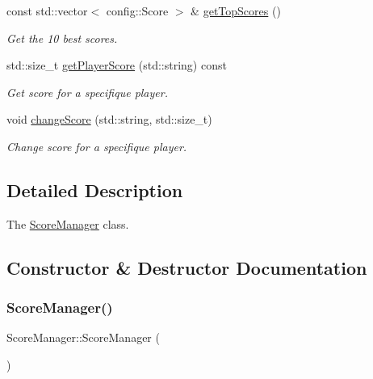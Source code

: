 \begin{DoxyCompactItemize}
\mbox{\label{classScoreManager_ad0c38dd0a27a82230d09f29ce3d12349}} 
const std\+::vector$<$ config\+::\+Score $>$ \& \hyperlink{classScoreManager_ad0c38dd0a27a82230d09f29ce3d12349}{get\+Top\+Scores} ()
\begin{DoxyCompactList}\small\item\em Get the 10 best scores. \end{DoxyCompactList}\item 
std\+::size\+\_\+t \hyperlink{classScoreManager_a9d529f071418d69a2b1745673d9d83b2}{get\+Player\+Score} (std\+::string) const
\begin{DoxyCompactList}\small\item\em Get score for a specifique player. \end{DoxyCompactList}\item 
void \hyperlink{classScoreManager_a16c1e33b2972b9609b6d568dc8b7a3b0}{change\+Score} (std\+::string, std\+::size\+\_\+t)
\begin{DoxyCompactList}\small\item\em Change score for a specifique player. \end{DoxyCompactList}\end{DoxyCompactItemize}


\subsection{Detailed Description}
The \hyperlink{classScoreManager}{Score\+Manager} class. 

\subsection{Constructor \& Destructor Documentation}
\mbox{\label{classScoreManager_a4f3866ff832127664543349da5c4fbf4}} 
\subsubsection{\texorpdfstring{Score\+Manager()}{ScoreManager()}}
{\footnotesize\ttfamily Score\+Manager\+::\+Score\+Manager (\begin{DoxyParamCaption}{ }\end{DoxyParamCaption})}



